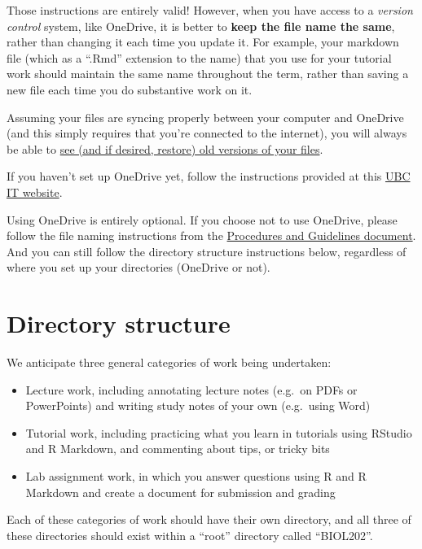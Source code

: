 \documentclass[
]{book}
\providecommand{\tightlist}{%
  \setlength{\itemsep}{0pt}\setlength{\parskip}{0pt}}
\begin{document}
Those instructions are entirely valid! However, when you have access to a \emph{version control} system, like OneDrive, it is better to \textbf{keep the file name the same}, rather than changing it each time you update it. For example, your markdown file (which as a ``.Rmd'' extension to the name) that you use for your tutorial work should maintain the same name throughout the term, rather than saving a new file each time you do substantive work on it.

Assuming your files are syncing properly between your computer and OneDrive (and this simply requires that you're connected to the internet), you will always be able to \href{https://support.microsoft.com/en-us/office/restore-a-previous-version-of-a-file-stored-in-onedrive-159cad6d-d76e-4981-88ef-de6e96c93893}{see (and if desired, restore) old versions of your files}.

If you haven't set up OneDrive yet, follow the instructions provided at this \href{https://lthub.ubc.ca/guides/microsoft-onedrive-student-guide/}{UBC IT website}.

Using OneDrive is entirely optional. If you choose not to use OneDrive, please follow the file naming instructions from the \href{https://ubco-biology.github.io/Procedures-and-Guidelines/file-naming.html}{Procedures and Guidelines document}. And you can still follow the directory structure instructions below, regardless of where you set up your directories (OneDrive or not).

\section{Directory structure}\label{dir_structure}

We anticipate three general categories of work being undertaken:

\begin{itemize}
\tightlist
\item
  Lecture work, including annotating lecture notes (e.g.~on PDFs or PowerPoints) and writing study notes of your own (e.g.~using Word)
\item
  Tutorial work, including practicing what you learn in tutorials using RStudio and R Markdown, and commenting about tips, or tricky bits
\item
  Lab assignment work, in which you answer questions using R and R Markdown and create a document for submission and grading
\end{itemize}

Each of these categories of work should have their own directory, and all three of these directories should exist within a ``root'' directory called ``BIOL202''.
\end{document}
